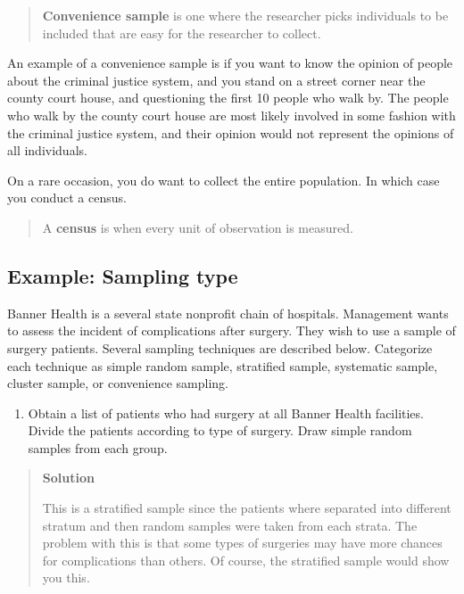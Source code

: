 \documentclass[]{book}
\providecommand{\tightlist}{%
  \setlength{\itemsep}{0pt}\setlength{\parskip}{0pt}}
\begin{document}
\begin{quote}
\textbf{Convenience sample} is one where the researcher picks individuals to be included that are easy for the researcher to collect.
\end{quote}

An example of a convenience sample is if you want to know the opinion of people about the criminal justice system, and you stand on a street corner near the county court house, and questioning the first 10 people who walk by. The people who walk by the county court house are most likely involved in some fashion with the criminal justice system, and their opinion would not represent the opinions of all individuals.

On a rare occasion, you do want to collect the entire population. In which case you conduct a census.

\begin{quote}
A \textbf{census} is when every unit of observation is measured.
\end{quote}

\hypertarget{example-sampling-type}{%
\subsection{Example: Sampling type}\label{example-sampling-type}}

Banner Health is a several state nonprofit chain of hospitals. Management wants to assess the incident of complications after surgery. They wish to use a sample of surgery patients. Several sampling techniques are described below. Categorize each technique as simple random sample, stratified sample, systematic sample, cluster sample, or convenience sampling.

\begin{enumerate}
\def\labelenumi{\alph{enumi}.}
\tightlist
\item
  Obtain a list of patients who had surgery at all Banner Health
  facilities. Divide the patients according to type of surgery. Draw
  simple random samples from each group.
\end{enumerate}

\begin{quote}
\textbf{Solution}

This is a stratified sample since the patients where separated into
different stratum and then random samples were taken from each
strata. The problem with this is that some types of surgeries may
have more chances for complications than others. Of course, the
stratified sample would show you this.
\end{quote}
\end{document}
